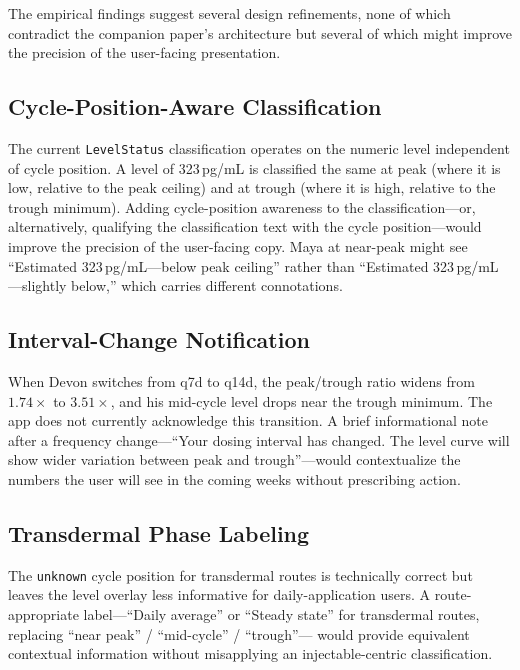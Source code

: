 \documentclass[11pt,a4paper]{article}
\newcommand{\code}[1]{\texttt{\small #1}}
\begin{document}
The empirical findings suggest several design refinements, none of which
contradict the companion paper's architecture but several of which might
improve the precision of the user-facing presentation.

\subsection{Cycle-Position-Aware Classification}

The current \code{LevelStatus} classification operates on the numeric level
independent of cycle position. A level of 323\,pg/mL is classified the same
at peak (where it is low, relative to the peak ceiling) and at trough (where
it is high, relative to the trough minimum). Adding cycle-position awareness
to the classification---or, alternatively, qualifying the classification
text with the cycle position---would improve the precision of the user-facing
copy. Maya at near-peak might see ``Estimated 323\,pg/mL---below peak
ceiling'' rather than ``Estimated 323\,pg/mL---slightly below,'' which
carries different connotations.

\subsection{Interval-Change Notification}

When Devon switches from q7d to q14d, the peak/trough ratio widens from
$1.74\times$ to $3.51\times$, and his mid-cycle level drops near the trough
minimum. The app does not currently acknowledge this transition. A brief
informational note after a frequency change---``Your dosing interval has
changed. The level curve will show wider variation between peak and
trough''---would contextualize the numbers the user will see in the coming
weeks without prescribing action.

\subsection{Transdermal Phase Labeling}

The \code{unknown} cycle position for transdermal routes is technically
correct but leaves the level overlay less informative for daily-application
users. A route-appropriate label---``Daily average'' or ``Steady state'' for
transdermal routes, replacing ``near peak'' / ``mid-cycle'' / ``trough''---
would provide equivalent contextual information without misapplying an
injectable-centric classification.
\end{document}
